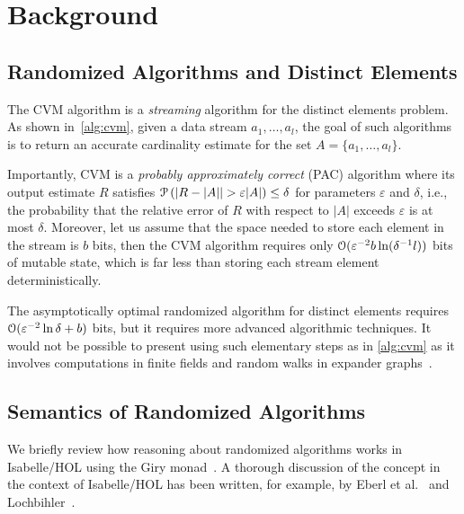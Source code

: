 \section{Background}
\label{sec:background}

\subsection{Randomized Algorithms and Distinct Elements}

The CVM algorithm is a \emph{streaming} algorithm for the distinct elements problem.
As shown in~\cref{alg:cvm}, given a data stream $a_1,\dots, a_l$, the goal of such algorithms is to return an accurate cardinality estimate for the set $A = \{a_1,\dots,a_l\}$.

Importantly, CVM is a \emph{probably approximately correct} (PAC) algorithm where its output estimate $R$ satisfies
$\operatorname{\mathcal P} \left( |R - |A| | > \varepsilon |A| \right) \leq \delta$
for parameters $\varepsilon$ and $\delta$,
i.e., the probability that the relative error of $R$ with respect to $|A|$ exceeds $\varepsilon$ is at most $\delta$. %
Moreover, let us assume that the space needed to store each element in the stream is $b$ bits, then the CVM algorithm requires only $\operatorname{\mathcal O}(\varepsilon^{-2} b \ln(\delta^{-1} l))$ bits of mutable state, which is far less than storing each stream element deterministically.

\begin{remark}
The asymptotically optimal randomized algorithm for distinct elements requires $\operatorname{\mathcal O}( \varepsilon^{-2} \ln \delta + b)$ bits, but it requires more advanced algorithmic techniques. It would not be possible to present using such elementary steps as in \cref{alg:cvm} as it involves computations in finite fields and random walks in expander graphs~\cite{blasiok2020, karayel2023}.
\lipicsEnd\end{remark}

\subsection{Semantics of Randomized Algorithms}
We briefly review how reasoning about randomized algorithms works in Isabelle/HOL using the Giry monad~\cite{giry1982}.
A thorough discussion of the concept in the context of Isabelle/HOL has been written, for example, by Eberl et al.~\cite{eberl2020} and Lochbihler~\cite{lochbihler2016}.


